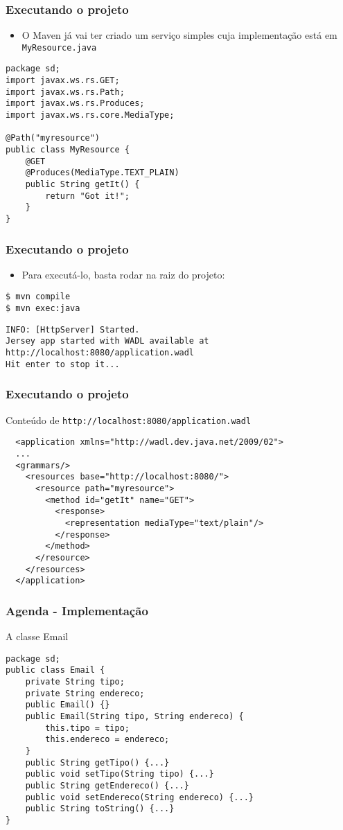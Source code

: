 \documentclass[Ligatures=TeX,table,brazil,svgnames,usetotalslideindicator,comp
ress,10pt]{beamer}
\begin{document}
\begin{frame}[fragile]
  \frametitle{Executando o projeto}
  \begin{itemize}
  \item O Maven já vai ter criado um serviço simples cuja implementação está em \texttt{MyResource.java}
  \end{itemize}

\begin{verbatim}
package sd;
import javax.ws.rs.GET;
import javax.ws.rs.Path;
import javax.ws.rs.Produces;
import javax.ws.rs.core.MediaType;

@Path("myresource")
public class MyResource {
    @GET
    @Produces(MediaType.TEXT_PLAIN)
    public String getIt() {
        return "Got it!";
    }
}
\end{verbatim}

\end{frame}

\begin{frame}[fragile]
  \frametitle{Executando o projeto}
  \begin{itemize}
  \item Para executá-lo, basta rodar na raiz do projeto:
  \end{itemize}

{\footnotesize
\texttt{\$ mvn compile}\\
\texttt{\$ mvn exec:java}
\begin{verbatim}
INFO: [HttpServer] Started.
Jersey app started with WADL available at
http://localhost:8080/application.wadl
Hit enter to stop it...
\end{verbatim}
}
\end{frame}

\begin{frame}[fragile]
  \frametitle{Executando o projeto}
Conteúdo de \texttt{http://localhost:8080/application.wadl}

{\footnotesize
\begin{verbatim}
  <application xmlns="http://wadl.dev.java.net/2009/02">
  ...
  <grammars/>
    <resources base="http://localhost:8080/">
      <resource path="myresource">
        <method id="getIt" name="GET">
          <response>
            <representation mediaType="text/plain"/>
          </response>
        </method>
      </resource>
    </resources>
  </application>
\end{verbatim}
}
\end{frame}

\begin{frame}[fragile]
  \frametitle{Agenda - Implementação}
  A classe Email
  \begin{verbatim}
package sd;
public class Email {
    private String tipo;
    private String endereco;
    public Email() {}
    public Email(String tipo, String endereco) {
        this.tipo = tipo;
        this.endereco = endereco;
    }
    public String getTipo() {...}
    public void setTipo(String tipo) {...}
    public String getEndereco() {...}
    public void setEndereco(String endereco) {...}
    public String toString() {...}
}
  \end{verbatim}

\end{frame}
\end{document}
